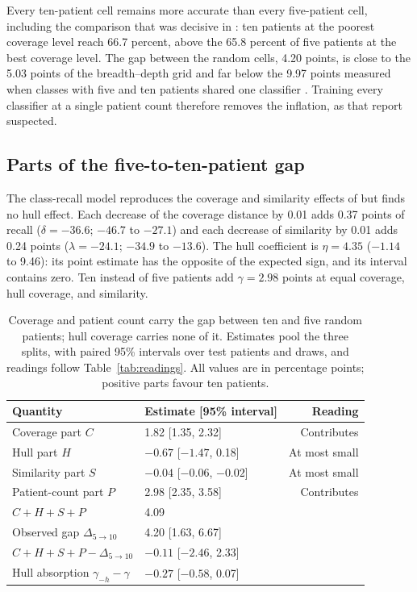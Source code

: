 \noindent Every ten-patient cell remains more accurate than every five-patient cell, including the comparison that was decisive in \citet{queisler2026shortageDecomposition}: ten patients at the poorest coverage level reach 66.7 percent, above the 65.8 percent of five patients at the best coverage level. The gap between the random cells, 4.20 points, is close to the 5.03 points of the breadth--depth grid \citep{queisler2026effectiveSupport} and far below the 9.97 points measured when classes with five and ten patients shared one classifier \citep{queisler2026shortageDecomposition}. Training every classifier at a single patient count therefore removes the inflation, as that report suspected.

\subsection{Parts of the five-to-ten-patient gap}
\label{sec:parts-results}
The class-recall model reproduces the coverage and similarity effects of \citet{queisler2026shortageDecomposition} but finds no hull effect. Each decrease of the coverage distance by 0.01 adds 0.37 points of recall ($\delta=-36.6$; $-46.7$ to $-27.1$) and each decrease of similarity by 0.01 adds 0.24 points ($\lambda=-24.1$; $-34.9$ to $-13.6$). The hull coefficient is $\eta=4.35$ ($-1.14$ to 9.46): its point estimate has the opposite of the expected sign, and its interval contains zero. Ten instead of five patients add $\gamma=2.98$ points at equal coverage, hull coverage, and similarity.

\begin{table}[htbp]
\centering
\small
\renewcommand{\arraystretch}{1.15}
\begin{tabular}{@{}llr@{}}
\toprule
Quantity & Estimate [95\% interval] & Reading \\
\midrule
Coverage part $C$ & 1.82 [1.35, 2.32] & Contributes \\
Hull part $H$ & $-0.67$ [$-1.47$, 0.18] & At most small \\
Similarity part $S$ & $-0.04$ [$-0.06$, $-0.02$] & At most small \\
Patient-count part $P$ & 2.98 [2.35, 3.58] & Contributes \\
\addlinespace
$C+H+S+P$ & 4.09 & \\
Observed gap $\Delta_{5\to10}$ & 4.20 [1.63, 6.67] & \\
$C+H+S+P-\Delta_{5\to10}$ & $-0.11$ [$-2.46$, 2.33] & \\
Hull absorption $\gamma_{-h}-\gamma$ & $-0.27$ [$-0.58$, 0.07] & \\
\bottomrule
\end{tabular}
\caption{Coverage and patient count carry the gap between ten and five random patients; hull coverage carries none of it. Estimates pool the three splits, with paired 95\% intervals over test patients and draws, and readings follow Table~\ref{tab:readings}. All values are in percentage points; positive parts favour ten patients.}
\label{tab:parts}
\end{table}


